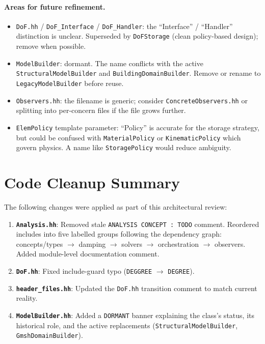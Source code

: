 \paragraph{Areas for future refinement.}
\begin{itemize}[nosep]
  \item \texttt{DoF.hh} / \texttt{DoF\_Interface} / \texttt{DoF\_Handler}: the
        ``Interface'' / ``Handler'' distinction is unclear.  Superseded by
        \texttt{DoFStorage} (clean policy-based design); remove when possible.
  \item \texttt{ModelBuilder}: dormant.  The name conflicts with the active
        \texttt{StructuralModelBuilder} and \texttt{BuildingDomainBuilder}.
        Remove or rename to \texttt{LegacyModelBuilder} before reuse.
  \item \texttt{Observers.hh}: the filename is generic; consider
        \texttt{ConcreteObservers.hh} or splitting into per-concern files
        if the file grows further.
  \item \texttt{ElemPolicy} template parameter: ``Policy'' is accurate for
        the storage strategy, but could be confused with
        \texttt{MaterialPolicy} or \texttt{KinematicPolicy} which govern
        physics.  A name like \texttt{StoragePolicy} would reduce ambiguity.
\end{itemize}


\section{Code Cleanup Summary}
\label{sec:arch:cleanup}

The following changes were applied as part of this architectural review:

\begin{enumerate}
  \item \textbf{\texttt{Analysis.hh}}: Removed stale \texttt{ANALYSIS CONCEPT : TODO}
        comment.  Reordered includes into five labelled groups following
        the dependency graph: concepts/types $\to$ damping $\to$
        solvers $\to$ orchestration $\to$ observers.  Added module-level
        documentation comment.

  \item \textbf{\texttt{DoF.hh}}: Fixed include-guard typo
        (\texttt{DEGGREE} $\to$ \texttt{DEGREE}).

  \item \textbf{\texttt{header\_files.hh}}: Updated the \texttt{DoF.hh}
        transition comment to match current reality.

  \item \textbf{\texttt{ModelBuilder.hh}}: Added a \texttt{DORMANT} banner
        explaining the class's status, its historical role, and the active
        replacements (\texttt{StructuralModelBuilder},
        \texttt{GmshDomainBuilder}).
\end{enumerate}

